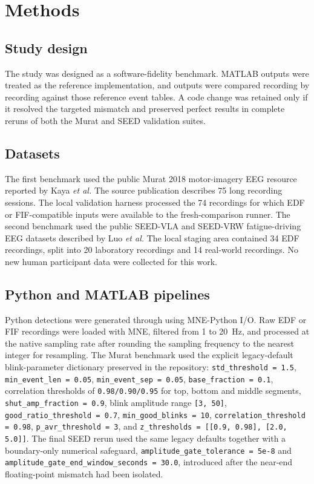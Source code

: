 \section{Methods}

\subsection{Study design}

The study was designed as a software-fidelity benchmark. MATLAB \blinker{} outputs were treated as the reference implementation, and \tool{} outputs were compared recording by recording against those reference event tables. A code change was retained only if it resolved the targeted mismatch and preserved perfect results in complete reruns of both the Murat and SEED validation suites.

\subsection{Datasets}

The first benchmark used the public Murat 2018 motor-imagery EEG resource reported by Kaya \emph{et al.}\supercite{kaya2018} The source publication describes 75 long recording sessions. The local validation harness processed the 74 recordings for which EDF or FIF-compatible inputs were available to the fresh-comparison runner. The second benchmark used the public SEED-VLA and SEED-VRW fatigue-driving EEG datasets described by Luo \emph{et al.}\supercite{luo2024} The local staging area contained 34 EDF recordings, split into 20 laboratory recordings and 14 real-world recordings. No new human participant data were collected for this work.

\subsection{Python and MATLAB pipelines}

Python detections were generated through \tool{} using MNE-Python I/O.\supercite{gramfort2013} Raw EDF or FIF recordings were loaded with MNE, filtered from 1 to \SI{20}{Hz}, and processed at the native sampling rate after rounding the sampling frequency to the nearest integer for resampling. The Murat benchmark used the explicit legacy-default blink-parameter dictionary preserved in the repository: \texttt{std\_threshold = 1.5}, \texttt{min\_event\_len = 0.05}, \texttt{min\_event\_sep = 0.05}, \texttt{base\_fraction = 0.1}, correlation thresholds of \texttt{0.98/0.90/0.95} for top, bottom and middle segments, \texttt{shut\_amp\_fraction = 0.9}, blink amplitude range \texttt{[3, 50]}, \texttt{good\_ratio\_threshold = 0.7}, \texttt{min\_good\_blinks = 10}, \texttt{correlation\_threshold = 0.98}, \texttt{p\_avr\_threshold = 3}, and \texttt{z\_thresholds = [[0.9, 0.98], [2.0, 5.0]]}. The final SEED rerun used the same legacy defaults together with a boundary-only numerical safeguard, \texttt{amplitude\_gate\_tolerance = 5e-8} and \texttt{amplitude\_gate\_end\_window\_seconds = 30.0}, introduced after the near-end floating-point mismatch had been isolated.

